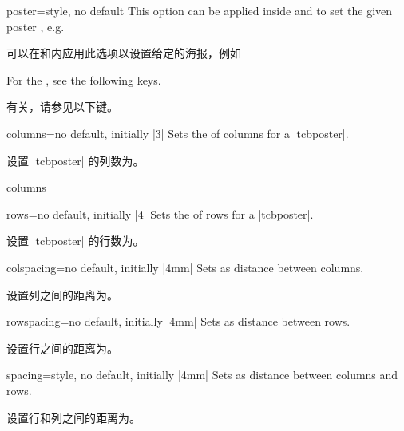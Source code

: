 \begin{postersetTcbKey}[][doc new=2017-07-03]{poster}{=}{style, no default}
This option can be applied inside  and 
to set the given poster , e.g.

可以在和内应用此选项以设置给定的海报，例如
\begin{dispListing}
\end{dispListing}
For the , see the following keys.

有关，请参见以下键。
\end{postersetTcbKey}


\begin{posterTcbKey}[][doc new=2017-07-03]{columns}{=}{no default, initially |3|}
Sets the  of columns for a |tcbposter|.

设置 |tcbposter| 的列数为。
\begin{exdispExample}{columns}
  \begin{tcbposter}[
    poster = {showframe,columns=5,rows=2,spacing=1mm,height=4cm},
  ]
  \end{tcbposter}
\end{exdispExample}
\end{posterTcbKey}

\begin{posterTcbKey}[][doc new=2017-07-03]{rows}{=}{no default, initially |4|}
Sets the  of rows for a |tcbposter|.

设置 |tcbposter| 的行数为。
\end{posterTcbKey}


\begin{posterTcbKey}[][doc new=2017-07-03]{colspacing}{=}{no default, initially |4mm|}
Sets  as distance between columns.

设置列之间的距离为。
\end{posterTcbKey}

\begin{posterTcbKey}[][doc new=2017-07-03]{rowspacing}{=}{no default, initially |4mm|}
Sets  as distance between rows.

设置行之间的距离为。
\end{posterTcbKey}

\begin{posterTcbKey}[][doc new=2017-07-03]{spacing}{=}{style, no default, initially |4mm|}
Sets  as distance between columns and rows.

设置行和列之间的距离为。
\end{posterTcbKey}


